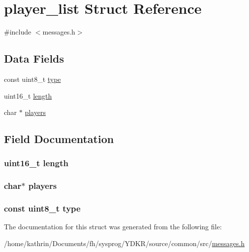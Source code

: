 \hypertarget{structplayer__list}{
\section{player\_\-list Struct Reference}
\label{structplayer__list}
}


{\ttfamily \#include $<$messages.h$>$}

\subsection*{Data Fields}
\begin{DoxyCompactItemize}
\item 
const uint8\_\-t \hyperlink{structplayer__list_aca7dafb0092715a03dd40f45fc607f2a}{type}
\item 
uint16\_\-t \hyperlink{structplayer__list_a1892eba2086d12ac2b09005aeb09ea3b}{length}
\item 
char $\ast$ \hyperlink{structplayer__list_a902412b0950bf2d91b0daf32c760997f}{players}
\end{DoxyCompactItemize}


\subsection{Field Documentation}
\hypertarget{structplayer__list_a1892eba2086d12ac2b09005aeb09ea3b}{
\subsubsection[{length}]{\setlength{\rightskip}{0pt plus 5cm}uint16\_\-t {\bf length}}}
\label{structplayer__list_a1892eba2086d12ac2b09005aeb09ea3b}
\hypertarget{structplayer__list_a902412b0950bf2d91b0daf32c760997f}{
\subsubsection[{players}]{\setlength{\rightskip}{0pt plus 5cm}char$\ast$ {\bf players}}}
\label{structplayer__list_a902412b0950bf2d91b0daf32c760997f}
\hypertarget{structplayer__list_aca7dafb0092715a03dd40f45fc607f2a}{
\subsubsection[{type}]{\setlength{\rightskip}{0pt plus 5cm}const uint8\_\-t {\bf type}}}
\label{structplayer__list_aca7dafb0092715a03dd40f45fc607f2a}


The documentation for this struct was generated from the following file:\begin{DoxyCompactItemize}
\item 
/home/kathrin/Documents/fh/sysprog/YDKR/source/common/src/\hyperlink{messages_8h}{messages.h}\end{DoxyCompactItemize}
